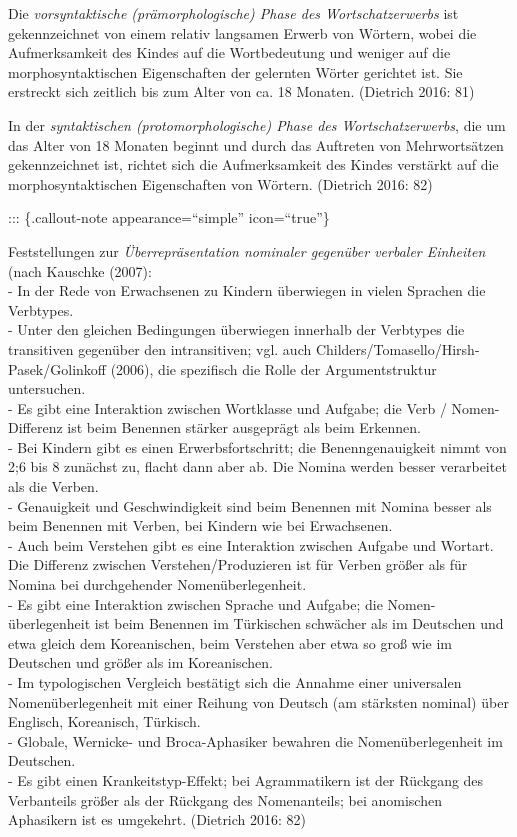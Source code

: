 \documentclass[
  letterpaper,
]{scrbook}
\begin{document}
Die \emph{vorsyntaktische (prämorphologische) Phase des
Wortschatzerwerbs} ist gekennzeichnet von einem relativ langsamen Erwerb
von Wörtern, wobei die Aufmerksamkeit des Kindes auf die Wortbedeutung
und weniger auf die morphosyntaktischen Eigenschaften der gelernten
Wörter gerichtet ist. Sie erstreckt sich zeitlich bis zum Alter von ca.
18 Monaten. (Dietrich 2016: 81)

In der \emph{syntaktischen (protomorphologische) Phase des
Wortschatzerwerbs}, die um das Alter von 18 Monaten beginnt und durch
das Auftreten von Mehrwortsätzen gekennzeichnet ist, richtet sich die
Aufmerksamkeit des Kindes verstärkt auf die morphosyntaktischen
Eigenschaften von Wörtern. (Dietrich 2016: 82)

::: \{.callout-note appearance=``simple'' icon=``true''\}

Feststellungen zur \emph{Überrepräsentation nominaler gegenüber verbaler
Einheiten} (nach Kauschke (2007):\\
- In der Rede von Erwachsenen zu Kindern überwiegen in vielen Sprachen
die Verbtypes.\\
- Unter den gleichen Bedingungen überwiegen innerhalb der Verbtypes die
transitiven gegenüber den intransitiven; vgl. auch
Childers/Tomasello/Hirsh-Pasek/Golinkoff (2006), die spezifisch die
Rolle der Argumentstruktur untersuchen.\\
- Es gibt eine Interaktion zwischen Wortklasse und Aufgabe; die Verb /
Nomen-Differenz ist beim Benennen stärker ausgeprägt als beim
Erkennen.\\
- Bei Kindern gibt es einen Erwerbsfortschritt; die Benenngenauigkeit
nimmt von 2;6 bis 8 zunächst zu, flacht dann aber ab. Die Nomina werden
besser verarbeitet als die Verben.\\
- Genauigkeit und Geschwindigkeit sind beim Benennen mit Nomina besser
als beim Benennen mit Verben, bei Kindern wie bei Erwachsenen.\\
- Auch beim Verstehen gibt es eine Interaktion zwischen Aufgabe und
Wortart. Die Differenz zwischen Verstehen/Produzieren ist für Verben
größer als für Nomina bei durchgehender Nomenüberlegenheit.\\
- Es gibt eine Interaktion zwischen Sprache und Aufgabe; die
Nomen-überlegenheit ist beim Benennen im Türkischen schwächer als im
Deutschen und etwa gleich dem Koreanischen, beim Verstehen aber etwa so
groß wie im Deutschen und größer als im Koreanischen.\\
- Im typologischen Vergleich bestätigt sich die Annahme einer
universalen Nomenüberlegenheit mit einer Reihung von Deutsch (am
stärksten nominal) über Englisch, Koreanisch, Türkisch.\\
- Globale, Wernicke- und Broca-Aphasiker bewahren die Nomenüberlegenheit
im Deutschen.\\
- Es gibt einen Krankeitstyp-Effekt; bei Agrammatikern ist der Rückgang
des Verbanteils größer als der Rückgang des Nomenanteils; bei anomischen
Aphasikern ist es umgekehrt. (Dietrich 2016: 82)
\end{document}
